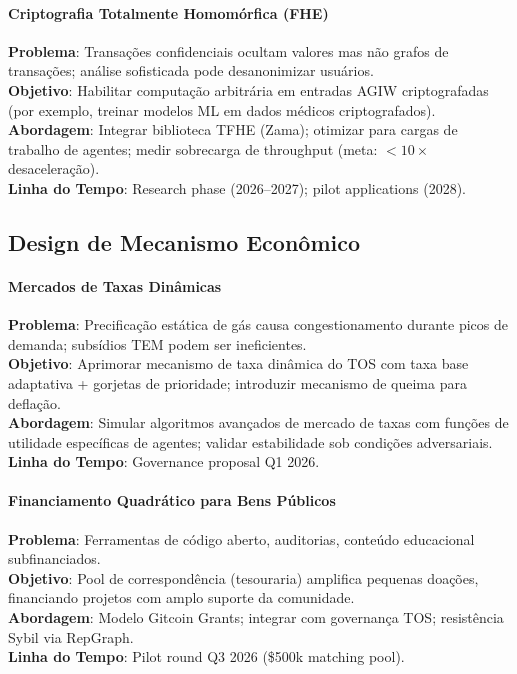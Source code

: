 \documentclass[11pt]{article}
\begin{document}
\begin{itemize}[noitemsep]
\begin{itemize}[noitemsep]
\begin{itemize}[noitemsep]
\paragraph{Criptografia Totalmente Homomórfica (FHE)}
\textbf{Problema}: Transações confidenciais ocultam valores mas não grafos de transações; análise sofisticada pode desanonimizar usuários.\\
\textbf{Objetivo}: Habilitar computação arbitrária em entradas AGIW criptografadas (por exemplo, treinar modelos ML em dados médicos criptografados).\\
\textbf{Abordagem}: Integrar biblioteca TFHE (Zama); otimizar para cargas de trabalho de agentes; medir sobrecarga de throughput (meta: $<10\times$ desaceleração).\\
\textbf{Linha do Tempo}: Research phase (2026--2027); pilot applications (2028).

\subsection{Design de Mecanismo Econômico}

\paragraph{Mercados de Taxas Dinâmicas}
\textbf{Problema}: Precificação estática de gás causa congestionamento durante picos de demanda; subsídios TEM podem ser ineficientes.\\
\textbf{Objetivo}: Aprimorar mecanismo de taxa dinâmica do TOS com taxa base adaptativa + gorjetas de prioridade; introduzir mecanismo de queima para deflação.\\
\textbf{Abordagem}: Simular algoritmos avançados de mercado de taxas com funções de utilidade específicas de agentes; validar estabilidade sob condições adversariais.\\
\textbf{Linha do Tempo}: Governance proposal Q1 2026.

\paragraph{Financiamento Quadrático para Bens Públicos}
\textbf{Problema}: Ferramentas de código aberto, auditorias, conteúdo educacional subfinanciados.\\
\textbf{Objetivo}: Pool de correspondência (tesouraria) amplifica pequenas doações, financiando projetos com amplo suporte da comunidade.\\
\textbf{Abordagem}: Modelo Gitcoin Grants; integrar com governança TOS; resistência Sybil via RepGraph.\\
\textbf{Linha do Tempo}: Pilot round Q3 2026 (\$500k matching pool).


\end{itemize}
\end{itemize}
\end{itemize}
\end{document}
